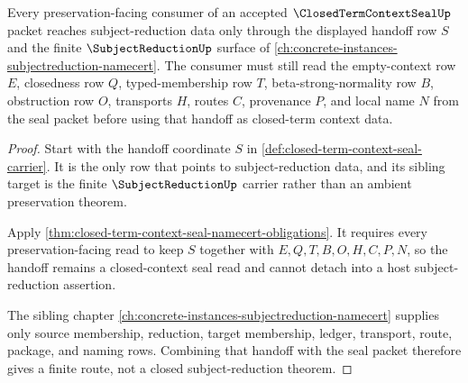 \begin{theorem}
\label{thm:closed-term-context-seal-subject-reduction-handoff}
Every preservation-facing consumer of an accepted $\ClosedTermContextSealUp$ packet reaches subject-reduction data only through the displayed handoff row $S$ and the finite $\SubjectReductionUp$ surface of \autoref{ch:concrete-instances-subjectreduction-namecert}. The consumer must still read the empty-context row $E$, closedness row $Q$, typed-membership row $T$, beta-strong-normality row $B$, obstruction row $O$, transports $H$, routes $C$, provenance $P$, and local name $N$ from the seal packet before using that handoff as closed-term context data.
\end{theorem}
\begin{proof}
Start with the handoff coordinate $S$ in \autoref{def:closed-term-context-seal-carrier}. It is the only row that points to subject-reduction data, and its sibling target is the finite $\SubjectReductionUp$ carrier rather than an ambient preservation theorem.

Apply \autoref{thm:closed-term-context-seal-namecert-obligations}. It requires every preservation-facing read to keep $S$ together with $E,Q,T,B,O,H,C,P,N$, so the handoff remains a closed-context seal read and cannot detach into a host subject-reduction assertion.

The sibling chapter \autoref{ch:concrete-instances-subjectreduction-namecert} supplies only source membership, reduction, target membership, ledger, transport, route, package, and naming rows. Combining that handoff with the seal packet therefore gives a finite route, not a closed subject-reduction theorem.
\end{proof}

